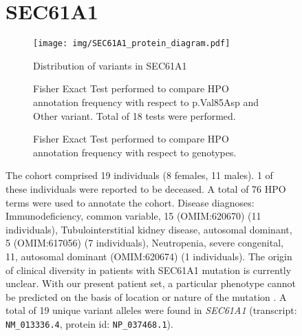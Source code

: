 \begin{figure}[htbp]
\section*{SEC61A1}
\centering
\begin{subfigure}[b]{0.95\textwidth}
\centering
\texttt{[image: img/SEC61A1\_protein\_diagram.pdf]} 
\captionsetup{justification=raggedright,singlelinecheck=false}
\caption{Distribution of variants in SEC61A1}
\end{subfigure}

\vspace{2em}

\begin{subfigure}[b]{0.95\textwidth}
\centering
{}
\captionsetup{justification=raggedright,singlelinecheck=false}
\caption{Fisher Exact Test performed to compare HPO annotation frequency with respect to p.Val85Asp and Other variant. Total of
        18 tests were performed.}
\end{subfigure}
\vspace{2em}
\begin{subfigure}[b]{0.95\textwidth}
\centering
{}
\captionsetup{justification=raggedright,singlelinecheck=false}
\caption{Fisher Exact Test performed to compare HPO annotation frequency with respect to genotypes.}
\end{subfigure}

\vspace{2em}

\caption{The cohort comprised 19 individuals (8 females, 11 males). 1 of these individuals were reported to be deceased. 
A total of 76 HPO terms were used to annotate the cohort. Disease diagnoses: Immunodeficiency, common variable, 15 (OMIM:620670) (11 individuals), 
Tubulointerstitial kidney disease, autosomal dominant, 5 (OMIM:617056) (7 individuals), Neutropenia, severe congenital, 11, autosomal dominant (OMIM:620674) 
(1 individuals). The origin of clinical diversity in patients with SEC61A1 mutation is currently unclear. 
With our present patient set, a particular phenotype cannot be predicted on the basis of location or nature of the mutation \cite{PMID_32325141}. 
A total of 19 unique variant alleles were found in \textit{SEC61A1} (transcript: \texttt{NM\_013336.4}, protein id: \texttt{NP\_037468.1}).}
\end{figure}
